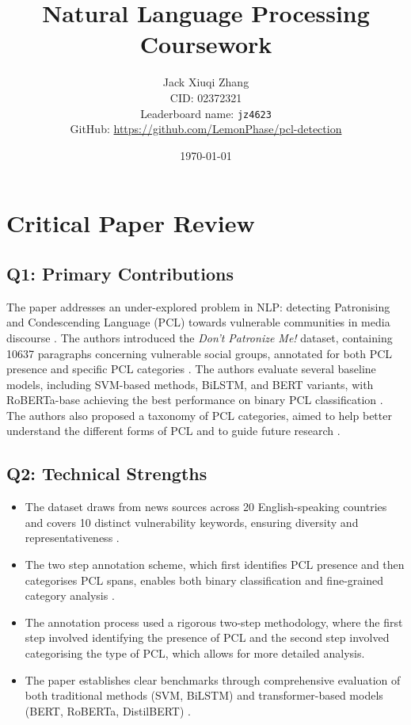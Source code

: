 \documentclass[11pt,a4paper]{article}
\title{Natural Language Processing Coursework}
\author{Jack Xiuqi Zhang\\CID: 02372321\\[0.5em]
\small Leaderboard name: \texttt{jz4623}\\[0.3em]
\small GitHub: \url{https://github.com/LemonPhase/pcl-detection}}
\date{\today}
\begin{document}
\maketitle
\tableofcontents
\newpage

\section{Critical Paper Review}

\subsection{Q1: Primary Contributions}

The paper addresses an under-explored problem in NLP: detecting Patronising and Condescending Language (PCL) towards vulnerable communities in media discourse \cite{perez-almendros-etal-2020-dont}.
The authors introduced the \textit{Don't Patronize Me!} dataset, containing 10637 paragraphs concerning vulnerable social groups, annotated for both PCL presence and specific PCL categories \cite{perez-almendros-etal-2020-dont}.
The authors evaluate several baseline models, including SVM-based methods, BiLSTM, and BERT variants, with RoBERTa-base achieving the best performance on binary PCL classification \cite{perez-almendros-etal-2020-dont}.
The authors also proposed a taxonomy of PCL categories, aimed to help better understand the different forms of PCL and to guide future research \cite{perez-almendros-etal-2020-dont}.

\subsection{Q2: Technical Strengths}

\begin{itemize}[noitemsep]
    \item The dataset draws from news sources across 20 English-speaking countries and covers 10 distinct vulnerability keywords, ensuring diversity and representativeness \cite{perez-almendros-etal-2020-dont}.
    \item The two step annotation scheme, which first identifies PCL presence and then categorises PCL spans, enables both binary classification and fine-grained category analysis \cite{perez-almendros-etal-2020-dont}.
    \item The annotation process used a rigorous two-step methodology, where the first step involved identifying the presence of PCL and the second step involved categorising the type of PCL, which allows for more detailed analysis.
    \item The paper establishes clear benchmarks through comprehensive evaluation of both traditional methods (SVM, BiLSTM) and transformer-based models (BERT, RoBERTa, DistilBERT) \cite{perez-almendros-etal-2020-dont}.
\end{itemize}
\end{document}
